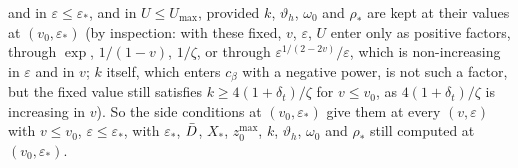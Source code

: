 and in $\varepsilon\le\varepsilon_*$, and in $U\le U_{\max}$, provided $k$, $\vartheta_h$, $\omega_0$ and $\rho_*$ are kept at their
values at $(v_0,\varepsilon_*)$ (by inspection: with these fixed, $v$, $\varepsilon$, $U$ enter only as positive factors, through
$\exp$, $1/(1-v)$, $1/\zeta$, or through $\varepsilon^{1/(2-2v)}/\varepsilon$, which is non-increasing in $\varepsilon$ and in $v$; $k$
itself, which enters $c_\beta$ with a negative power, is not such a factor, but the fixed value still satisfies
$k\ge4(1+\delta_t)/\zeta$ for $v\le v_0$, as $4(1+\delta_t)/\zeta$ is increasing in $v$). So the side conditions at $(v_0,\varepsilon_*)$
give them at every $(v,\varepsilon)$ with $v\le v_0$, $\varepsilon\le\varepsilon_*$, with $\varepsilon_*$, $\bar D$, $X_*$,
$z_0^{\max}$, $k$, $\vartheta_h$, $\omega_0$ and $\rho_*$ still computed at $(v_0,\varepsilon_*)$.

